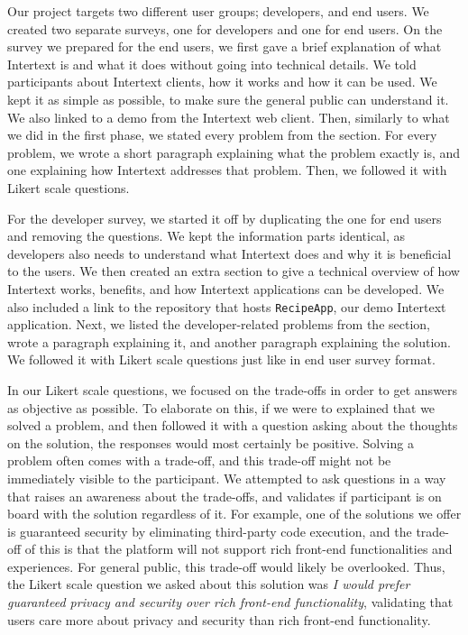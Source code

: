 Our project targets two different user groups; developers, and end users. We created two separate surveys, one for developers and one for end users. On the survey we prepared for the end users, we first gave a brief explanation of what Intertext is and what it does without going into technical details. We told participants about Intertext clients, how it works and how it can be used. We kept it as simple as possible, to make sure the general public can understand it. We also linked to a demo from the Intertext web client. Then, similarly to what we did in the first phase, we stated every problem from the  section. For every problem, we wrote a short paragraph explaining what the problem exactly is, and one explaining how Intertext addresses that problem. Then, we followed it with Likert scale questions. 

For the developer survey, we started it off by duplicating the one for end users and removing the questions. We kept the information parts identical, as developers also needs to understand what Intertext does and why it is beneficial to the users. We then created an extra section to give a technical overview of how Intertext works, benefits, and how Intertext applications can be developed. We also included a link to the repository that hosts \texttt{RecipeApp}, our demo Intertext application. Next, we listed the developer-related problems from the  section, wrote a paragraph explaining it, and another paragraph explaining the solution. We followed it with Likert scale questions just like in end user survey format.

In our Likert scale questions, we focused on the trade-offs in order to get answers as objective as possible. To elaborate on this, if we were to explained that we solved a problem, and then followed it with a question asking about the thoughts on the solution, the responses would most certainly be positive. Solving a problem often comes with a trade-off, and this trade-off might not be immediately visible to the participant. We attempted to ask questions in a way that raises an awareness about the trade-offs, and validates if participant is on board with the solution regardless of it. For example, one of the solutions we offer is guaranteed security by eliminating third-party code execution, and the trade-off of this is that the platform will not support rich front-end functionalities and experiences. For general public, this trade-off would likely be overlooked. Thus, the Likert scale question we asked about this solution was \textit{I would prefer guaranteed privacy and security over rich front-end functionality}, validating that users care more about privacy and security than rich front-end functionality.

